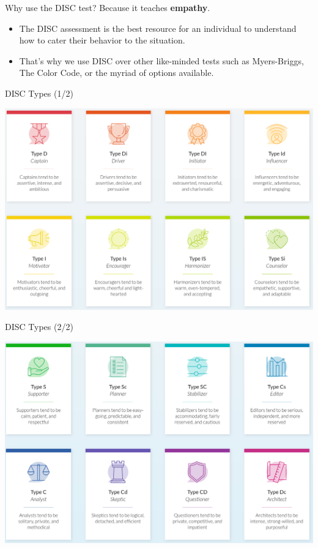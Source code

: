 \documentclass{beamer}
\theoremstyle{mystyle}
\begin{document}
\begin{frame}{Why use the DISC test?}
	Because it teaches \textbf{empathy}. 
	\begin{itemize}
		\item<2-> The DISC assessment is the best resource for an individual to understand how to cater their behavior to the situation. 
		\item<3-> That's why we use DISC over other like-minded tests such as Myers-Briggs, The Color Code, or the myriad of options available.
	\end{itemize}
\end{frame}


\begin{frame}{DISC Types (1/2)}
	\begin{center}
		\includegraphics[scale=.25]{images/complete-disc-1}
	\end{center}
\end{frame}

\begin{frame}{DISC Types (2/2)}
	\begin{center}
		\includegraphics[scale=.25]{images/complete-disc-2}
	\end{center}
\end{frame}
\end{document}
